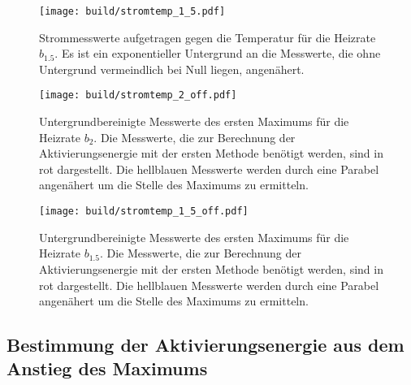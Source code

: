 \begin{figure}
  \centering
  \texttt{[image: build/stromtemp\_1\_5.pdf]}
  \caption{Strommesswerte aufgetragen gegen die Temperatur für die Heizrate $b_{1.5}$. Es ist ein exponentieller
  Untergrund an die Messwerte, die ohne Untergrund vermeindlich bei Null liegen, angenähert.}
  \label{fig:messwerte15}
\end{figure}

\begin{figure}
  \centering
  \texttt{[image: build/stromtemp\_2\_off.pdf]}
  \caption{Untergrundbereinigte Messwerte des ersten Maximums für die Heizrate $b_{2}$. Die Messwerte, die zur Berechnung der Aktivierungsenergie mit der
  ersten Methode benötigt werden, sind in rot dargestellt. Die hellblauen Messwerte werden durch eine Parabel angenähert um
  die Stelle des Maximums zu ermitteln.}
  \label{fig:messwerte2off}
\end{figure}

\begin{figure}
  \centering
  \texttt{[image: build/stromtemp\_1\_5\_off.pdf]}
  \caption{Untergrundbereinigte Messwerte des ersten Maximums für die Heizrate $b_{1.5}$. Die Messwerte, die zur Berechnung der Aktivierungsenergie mit der
  ersten Methode benötigt werden, sind in rot dargestellt. Die hellblauen Messwerte werden durch eine Parabel angenähert um
  die Stelle des Maximums zu ermitteln.}
  \label{fig:messwerte15off}
\end{figure}

\subsection{Bestimmung der Aktivierungsenergie aus dem Anstieg des Maximums}

